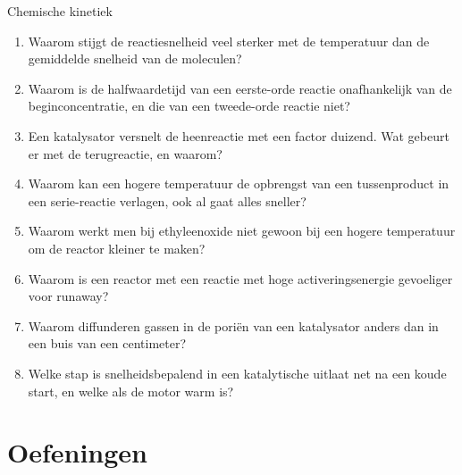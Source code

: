 \begin{reflectie}{Chemische kinetiek}
\begin{enumerate}
\item Waarom stijgt de reactiesnelheid veel sterker met de temperatuur dan de gemiddelde snelheid van de moleculen?
\item Waarom is de halfwaardetijd van een eerste-orde reactie onafhankelijk van de beginconcentratie, en die van een tweede-orde reactie niet?
\item Een katalysator versnelt de heenreactie met een factor duizend. Wat gebeurt er met de terugreactie, en waarom?
\item Waarom kan een hogere temperatuur de opbrengst van een tussenproduct in een serie-reactie verlagen, ook al gaat alles sneller?
\item Waarom werkt men bij ethyleenoxide niet gewoon bij een hogere temperatuur om de reactor kleiner te maken?
\item Waarom is een reactor met een reactie met hoge activeringsenergie gevoeliger voor runaway?
\item Waarom diffunderen gassen in de poriën van een katalysator anders dan in een buis van een centimeter?
\item Welke stap is snelheidsbepalend in een katalytische uitlaat net na een koude start, en welke als de motor warm is?
\end{enumerate}
\end{reflectie}

\newpage
\section{Oefeningen}


